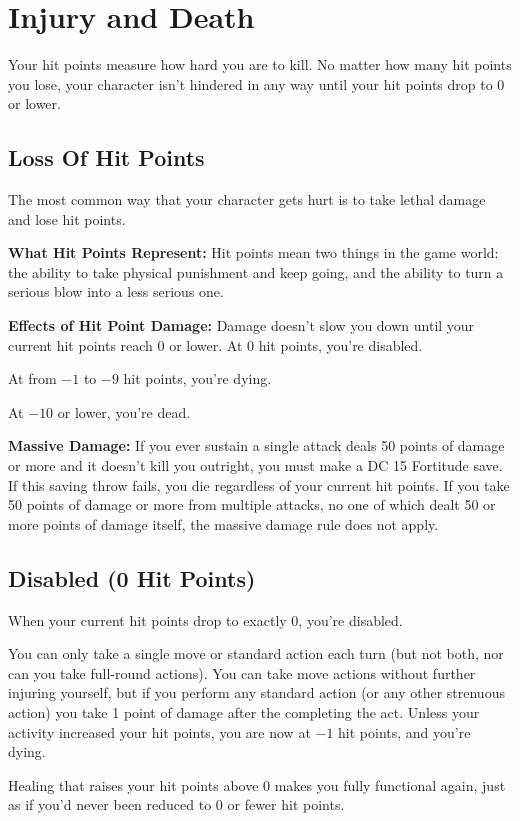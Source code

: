\section{Injury and Death}
Your hit points measure how hard you are to kill. No matter how many hit points you lose, your character isn't hindered in any way until your hit points drop to 0 or lower.

\subsection{Loss Of Hit Points}
The most common way that your character gets hurt is to take lethal damage and lose hit points.

\textbf{What Hit Points Represent:} Hit points mean two things in the game world: the ability to take physical punishment and keep going, and the ability to turn a serious blow into a less serious one.

\textbf{Effects of Hit Point Damage:} Damage doesn't slow you down until your current hit points reach 0 or lower. At 0 hit points, you're disabled.

At from $-1$ to $-9$ hit points, you're dying.

At $-10$ or lower, you're dead.

\textbf{Massive Damage:} If you ever sustain a single attack deals 50 points of damage or more and it doesn't kill you outright, you must make a DC 15 Fortitude save. If this saving throw fails, you die regardless of your current hit points. If you take 50 points of damage or more from multiple attacks, no one of which dealt 50 or more points of damage itself, the massive damage rule does not apply.


\subsection{Disabled (0 Hit Points)}
When your current hit points drop to exactly 0, you're disabled.

You can only take a single move or standard action each turn (but not both, nor can you take full-round actions). You can take move actions without further injuring yourself, but if you perform any standard action (or any other strenuous action) you take 1 point of damage after the completing the act. Unless your activity increased your hit points, you are now at $-1$ hit points, and you're dying.

Healing that raises your hit points above 0 makes you fully functional again, just as if you'd never been reduced to 0 or fewer hit points.

